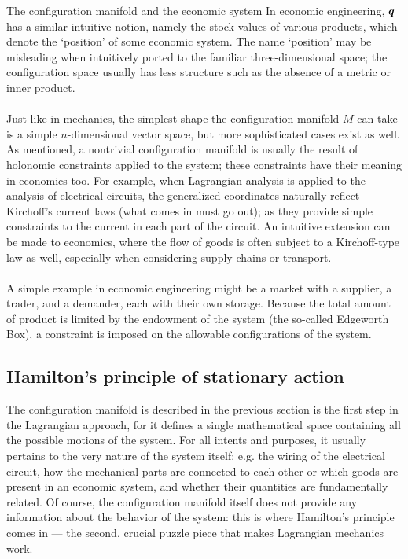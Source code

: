 \begin{econ}{The configuration manifold and the economic system}
    In economic engineering, \(\vb*{q}\) has a similar intuitive notion, namely the stock values of various products, which denote the `position' of some economic system. The name `position' may be misleading when intuitively ported to the familiar three-dimensional space; the configuration space usually has less structure such as the absence of a metric or inner product.\\~\\
    Just like in mechanics, the simplest shape the configuration manifold $M$ can take is a simple $n$-dimensional vector space, but more sophisticated cases exist as well. As mentioned, a nontrivial configuration manifold is usually the result of holonomic constraints applied to the system; these constraints have their meaning in economics too.
    For example, when Lagrangian analysis is applied to the analysis of electrical circuits, the generalized coordinates naturally reflect Kirchoff's current laws (what comes in must go out); as they provide simple constraints to the current in each part of the circuit. An intuitive extension can be made to economics, where the flow of goods is often subject to a Kirchoff-type law as well, especially when considering supply chains or transport. \\~\\
    A simple example in economic engineering might be a market with a supplier, a trader, and a demander, each with their own storage. Because the total amount of product is limited by the endowment of the system (the so-called Edgeworth Box), a constraint is imposed on the allowable configurations of the system.
\end{econ}

\subsection{Hamilton's principle of stationary action}
The configuration manifold is described in the previous section is the first step in the Lagrangian approach, for it defines a single mathematical space containing all the possible motions of the system. For all intents and purposes, it usually pertains to the very nature of the system itself; e.g. the wiring of the electrical circuit, how the mechanical parts are connected to each other or which goods are present in an economic system, and whether their quantities are fundamentally related. Of course, the configuration manifold itself does not provide any information about the behavior of the system: this is where Hamilton's principle comes in --- the second, crucial puzzle piece that makes Lagrangian mechanics work.

